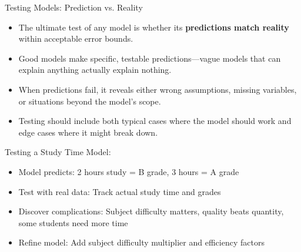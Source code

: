 \documentclass{beamer}
\begin{document}
	\begin{frame}{Testing Models: Prediction vs. Reality}
		\begin{itemize}
			\item The ultimate test of any model is whether its \textbf{predictions match reality} within acceptable error bounds.
			\item Good models make specific, testable predictions—vague models that can explain anything actually explain nothing.
			\item When predictions fail, it reveals either wrong assumptions, missing variables, or situations beyond the model's scope.
			\item Testing should include both typical cases where the model should work and edge cases where it might break down.
		\end{itemize}
		
		\begin{example}
			\scriptsize
			Testing a Study Time Model:
			\begin{itemize}
				\item Model predicts: 2 hours study = B grade, 3 hours = A grade
				\item Test with real data: Track actual study time and grades
				\item Discover complications: Subject difficulty matters, quality beats quantity, some students need more time
				\item Refine model: Add subject difficulty multiplier and efficiency factors
			\end{itemize}
		\end{example}
	\end{frame}
	
\end{document}
